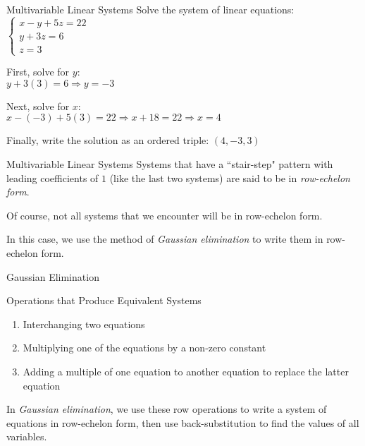 \documentclass[t]{beamer}
\def\then{\Rightarrow}
\begin{document}
	\begin{frame}{Multivariable Linear Systems}
		Solve the system of linear equations: $\begin{cases}
		x - y + 5z = 22 \\ y + 3z = 6 \\ z = 3
		\end{cases}$ \pause
		
		First, solve for $y$: \\ $y + 3(3) = 6 \then y = -3$ \pause
		
		Next, solve for $x$: \\ $x - (-3) + 5(3) = 22 \then x + 18 = 22 \then x = 4$ \pause
		
		Finally, write the solution as an ordered triple: $(4, -3, 3)$
	\end{frame}

	\begin{frame}{Multivariable Linear Systems}
		Systems that have a ``stair-step" pattern with leading coefficients of $1$ (like the last two systems) are said to be in \textit{row-echelon form}. \pause
		
		Of course, not all systems that we encounter will be in row-echelon form. \pause
		
		In this case, we use the method of \textit{Gaussian elimination} to write them in row-echelon form.
	\end{frame}

	\begin{frame}{Gaussian Elimination}
		\begin{block}{Operations that Produce Equivalent Systems}
			\begin{enumerate}[1)]
				\item Interchanging two equations
				\item Multiplying one of the equations by a non-zero constant
				\item Adding a multiple of one equation to another equation to replace the latter equation
			\end{enumerate}
		\end{block} \pause
	
		In \textit{Gaussian elimination}, we use these row operations to write a system of equations in row-echelon form, then use back-substitution to find the values of all variables.
	\end{frame}
\end{document}
